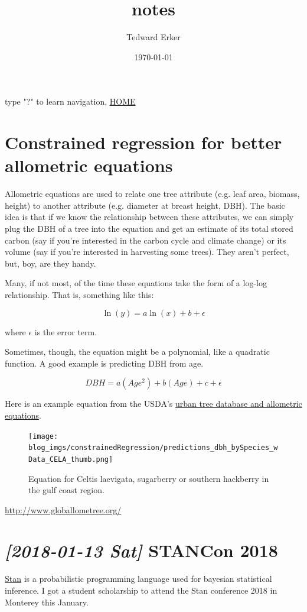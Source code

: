 \documentclass{article}
\author{Tedward Erker}
\date{\today}
\title{notes}
\begin{document}
\maketitle
\tableofcontents

type "?" to learn navigation, \href{index.html}{HOME}

\section*{Constrained regression for better allometric equations}
\label{sec:org0b41269}
Allometric equations are used to relate one tree attribute (e.g. leaf
area, biomass, height) to another attribute (e.g. diameter at breast
height, DBH).  The basic idea is that if we know the relationship between
these attributes, we can simply plug the DBH of a tree into the
equation and get an estimate of its total stored carbon (say if you're
interested in the carbon cycle and climate change) or its volume (say
if you're interested in harvesting some trees).  They aren't perfect,
but, boy, are they handy.

Many, if not most, of the time these equations take the form of a
log-log relationship.  That is, something like this:

\[
\ln(y) = a\ln(x) + b + \epsilon
\]

where \(\epsilon\) is the error term.

Sometimes, though, the equation might be a polynomial, like a
quadratic function.  A good example is predicting DBH from age.

\[
DBH = a(Age^2) + b(Age) + c + \epsilon
\]

Here is an example equation from the USDA's \href{https://www.fs.usda.gov/treesearch/pubs/52933}{urban tree database and
allometric equations}.

\begin{figure}[htbp]
\centering
\texttt{[image: blog\_imgs/constrainedRegression/predictions\_dbh\_bySpecies\_wData\_CELA\_thumb.png]}
\caption{Equation for Celtis laevigata, sugarberry or southern hackberry in the gulf coast region.}
\end{figure}


\url{http://www.globallometree.org/}


\section*{\textit{[2018-01-13 Sat] } STANCon 2018}
\label{sec:orgc0772c8}
\href{http://mc-stan.org/}{Stan} is a probabilistic programming language used for bayesian
statistical inference. I got a student scholarship to attend the Stan
conference 2018 in Monterey this January.
\end{document}
